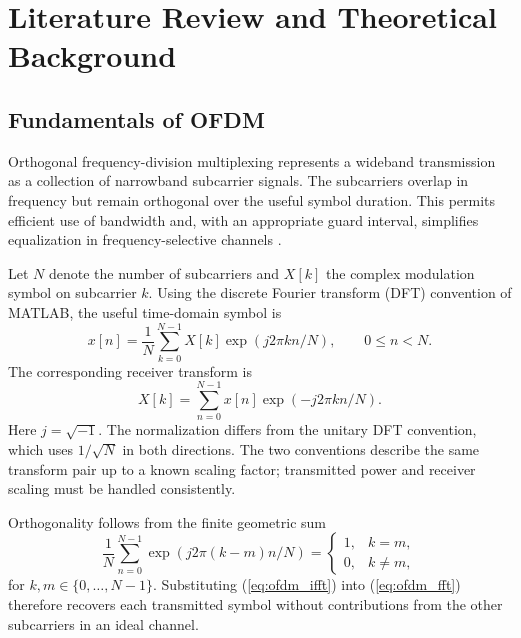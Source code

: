\chapter[Literature Review and Theory]
{Literature Review and Theoretical Background}
\label{chap:theory}

\section{Fundamentals of OFDM}
Orthogonal frequency-division multiplexing represents a wideband transmission as a collection of narrowband subcarrier signals. The subcarriers overlap in frequency but remain orthogonal over the useful symbol duration. This permits efficient use of bandwidth and, with an appropriate guard interval, simplifies equalization in frequency-selective channels \cite{vannee2000,morelli2007}.

Let $N$ denote the number of subcarriers and $X[k]$ the complex modulation symbol on subcarrier $k$. Using the discrete Fourier transform (DFT) convention of MATLAB, the useful time-domain symbol is
\begin{equation}
 x[n]=\frac{1}{N}\sum_{k=0}^{N-1}X[k]\exp(j2\pi kn/N),\qquad 0\leq n<N.
 \label{eq:ofdm_ifft}
\end{equation}
The corresponding receiver transform is
\begin{equation}
 X[k]=\sum_{n=0}^{N-1}x[n]\exp(-j2\pi kn/N).
 \label{eq:ofdm_fft}
\end{equation}
Here $j=\sqrt{-1}$. The normalization differs from the unitary DFT convention, which uses $1/\sqrt{N}$ in both directions. The two conventions describe the same transform pair up to a known scaling factor; transmitted power and receiver scaling must be handled consistently.

Orthogonality follows from the finite geometric sum
\begin{equation}
 \frac{1}{N}\sum_{n=0}^{N-1}\exp(j2\pi(k-m)n/N)
 =\begin{cases}1,&k=m,\\0,&k\ne m,\end{cases}
 \label{eq:orthogonality}
\end{equation}
for $k,m\in\{0,\ldots,N-1\}$. Substituting (\ref{eq:ofdm_ifft}) into (\ref{eq:ofdm_fft}) therefore recovers each transmitted symbol without contributions from the other subcarriers in an ideal channel.

